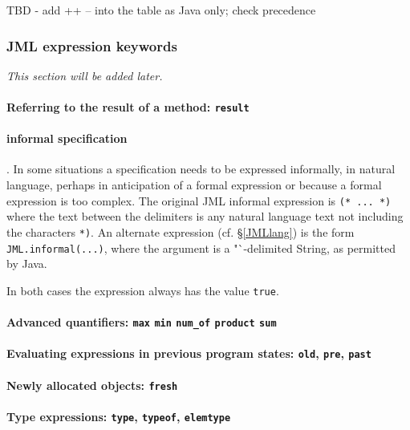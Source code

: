 TBD - add ++ -- into the table as Java only; check precedence

\subsubsection{JML expression keywords}
\label{JMLkeywords}
\textit{This section will be added later.} %

\paragraph{Referring to the result of a method: \texttt{\bs result}}

\paragraph{informal specification}. In some situations a specification needs to be expressed informally, in natural language, perhaps in anticipation of a formal expression or because a formal expression is too complex. The original JML informal expression is
{\center \texttt{(* ... *)}}
where the text between the delimiters is any natural language text not including the characters \texttt{*)}. 
An alternate expression (cf. \S\ref{JMLlang}) is the form \texttt{JML.informal(...)}, where the argument is a "`-delimited String, as permitted by Java.

In both cases the expression always has the value \texttt{true}.



\paragraph{Advanced quantifiers: \texttt{\bs max} \texttt{\bs min}
                \texttt{\bs num\_of} \texttt{\bs product} \texttt{\bs sum}}

\paragraph{Evaluating expressions in previous program states: \texttt{\bs old}, \texttt{\bs pre}, \texttt{\bs past}}

\paragraph{Newly allocated objects: \texttt{\bs fresh}}

\paragraph{Type expressions: \texttt{\bs type}, \texttt{\bs typeof}, \texttt{\bs elemtype}}

